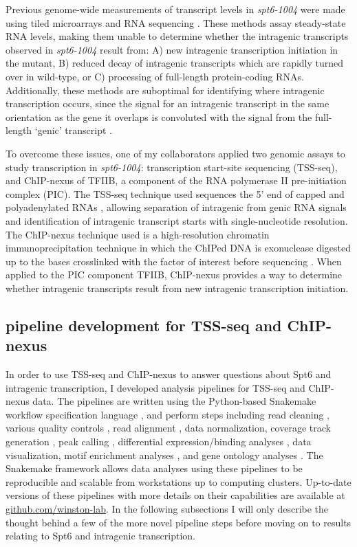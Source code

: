 \documentclass[9pt, letterpaper]{article}
\begin{document}
Previous genome-wide measurements of transcript levels in \textit{spt6-1004} were made using tiled microarrays \cite{cheung2008} and RNA sequencing \cite{uwimana2017}. These methods assay steady-state RNA levels, making them unable to determine whether the intragenic transcripts observed in \textit{spt6-1004} result from: A) new intragenic transcription initiation in the mutant, B) reduced decay of intragenic transcripts which are rapidly turned over in wild-type, or C) processing of full-length protein-coding RNAs. Additionally, these methods are suboptimal for identifying where intragenic transcription occurs, since the signal for an intragenic transcript in the same orientation as the gene it overlaps is convoluted with the signal from the full-length `genic' transcript \cite{cheung2008, lickwar2009}.

To overcome these issues, one of my collaborators applied two genomic assays to study transcription in \textit{spt6-1004}: transcription start-site sequencing (TSS-seq), and ChIP-nexus of TFIIB, a component of the RNA polymerase II pre-initiation complex (PIC). The TSS-seq technique used sequences the 5' end of capped and polyadenylated RNAs \cite{arribere2013, malabat2015}, allowing separation of intragenic from genic RNA signals and identification of intragenic transcript starts with single-nucleotide resolution. The ChIP-nexus technique used is a high-resolution chromatin immunoprecipitation technique in which the ChIPed DNA is exonuclease digested up to the bases crosslinked with the factor of interest before sequencing \cite{he2015}. When applied to the PIC component TFIIB, ChIP-nexus provides a way to determine whether intragenic transcripts result from new intragenic transcription initiation.

\subsection{pipeline development for TSS-seq and ChIP-nexus}

In order to use TSS-seq and ChIP-nexus to answer questions about Spt6 and intragenic transcription, I developed analysis pipelines for TSS-seq and ChIP-nexus data. The pipelines are written using the Python-based Snakemake workflow specification language \cite{koster2012}, and perform steps including read cleaning \cite{martin2011}, various quality controls \cite{andrews2012}, read alignment \cite{kim2013, langmead2012}, data normalization, coverage track generation \cite{quinlan2010}, peak calling \cite{zhang2008}, differential expression/binding analyses \cite{love2014}, data visualization, motif enrichment analyses \cite{bailey2015}, and gene ontology analyses \cite{young2010}. The Snakemake framework allows data analyses using these pipelines to be reproducible and scalable from workstations up to computing clusters. Up-to-date versions of these pipelines with more details on their capabilities are available at \href{https://github.com/winston-lab}{github.com/winston-lab}. In the following subsections I will only describe the thought behind a few of the more novel pipeline steps before moving on to results relating to Spt6 and intragenic transcription.
\end{document}
